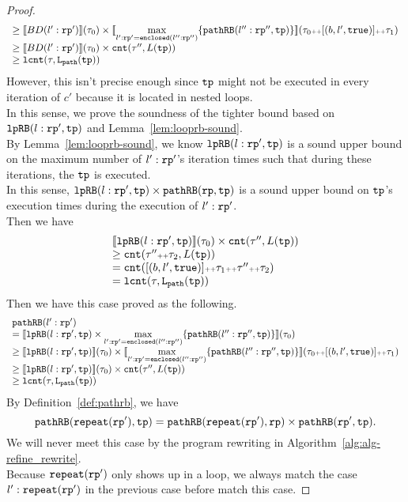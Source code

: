 \begin{proof}
\[\begin{array}{l}
  \geq \llbracket  BD(l':\mathtt{rp}') \rrbracket(\mathtt{\tau}_0) \times 
  \llbracket \max\limits_{l': \mathtt{rp}' = \mathtt{enclosed}(l'':\mathtt{rp}'')} \{\mathtt{pathRB}(l'':\mathtt{rp}'', \mathtt{tp})\} \rrbracket
  (\mathtt{\tau}_0 {\scriptscriptstyle ++} [(b, l', \mathtt{true})] {\scriptscriptstyle ++} \mathtt{\tau}_1)\\
  \geq \llbracket  BD(l':\mathtt{rp}') \rrbracket(\mathtt{\tau}_0) \times \mathtt{cnt}(\mathtt{\tau}'', L(\mathtt{tp})) \\
  \geq \mathtt{lcnt}(\mathtt{\tau}, \mathtt{L}_{\mathtt{path}}(\mathtt{tp}))
  \end{array}
\]
However, this isn't precise enough since $\mathtt{tp}$ might not be executed in every iteration of $c'$ because it is located in nested loops. 
\\
In this sense, we prove the soundness of the tighter bound based on $\mathtt{lpRB}(l:\mathtt{rp}', \mathtt{tp})$ and Lemma~\ref{lem:looprb-sound}.
\\
By Lemma~\ref{lem:looprb-sound}, we know $\mathtt{lpRB}(l:\mathtt{rp}', \mathtt{tp})$ is a sound upper bound on the maximum number of $l': \mathtt{rp}'$'s iteration times such that during these iterations, the $\mathtt{tp}$ is executed.
\\
In this sense, $\mathtt{lpRB}(l:\mathtt{rp}', \mathtt{tp}) \times \mathtt{pathRB}(\mathtt{rp}, \mathtt{tp})$ is a sound upper bound on $\mathtt{tp}$'s execution times during the execution of $l': \mathtt{rp}'$.
\\
Then we have
\[
  \begin{array}{l}
  \llbracket  \mathtt{lpRB}(l:\mathtt{rp}', \mathtt{tp}) \rrbracket(\mathtt{\tau}_0) \times \mathtt{cnt}(\mathtt{\tau}'', L(\mathtt{tp})) \\
  \geq \mathtt{cnt}(\mathtt{\tau}'' {\scriptscriptstyle ++} \mathtt{\tau}_2, L(\mathtt{tp}))\\
  = \mathtt{cnt}([(b, l', \mathtt{true})] {\scriptscriptstyle ++} \mathtt{\tau}_1 {\scriptscriptstyle ++} \mathtt{\tau}'' {\scriptscriptstyle ++} \mathtt{\tau}_2)\\
  = \mathtt{lcnt}(\mathtt{\tau}, \mathtt{L}_{\mathtt{path}}(\mathtt{tp}))
  \end{array}
\]
Then we have this case proved as the following.
\[
  \begin{array}{l}
  \mathtt{pathRB}(l':\mathtt{rp}') \\
  = \llbracket  \mathtt{lpRB}(l:\mathtt{rp}', \mathtt{tp}) \times \max\limits_{l': \mathtt{rp}' = \mathtt{enclosed}(l'':\mathtt{rp}'')} \{\mathtt{pathRB}(l'':\mathtt{rp}'', \mathtt{tp})\} \rrbracket(\mathtt{\tau}_0) \\
  \geq \llbracket  \mathtt{lpRB}(l:\mathtt{rp}', \mathtt{tp})  \rrbracket(\mathtt{\tau}_0) \times
  \llbracket \max\limits_{l': \mathtt{rp}' = \mathtt{enclosed}(l'':\mathtt{rp}'')} \{\mathtt{pathRB}(l'':\mathtt{rp}'', \mathtt{tp})\} \rrbracket 
  (\mathtt{\tau}_0 {\scriptscriptstyle ++} [(b, l', \mathtt{true})] {\scriptscriptstyle ++} \mathtt{\tau}_1) \\
  \geq \llbracket  \mathtt{lpRB}(l:\mathtt{rp}', \mathtt{tp}) \rrbracket(\mathtt{\tau}_0) \times \mathtt{cnt}(\mathtt{\tau}'', L(\mathtt{tp})) \\
  \geq \mathtt{lcnt}(\mathtt{\tau}, \mathtt{L}_{\mathtt{path}}(\mathtt{tp}))
  \end{array}
\]
%
By Definition~\ref{def:pathrb}, we have
\[
  \mathtt{pathRB}(\mathtt{repeat}(\mathtt{rp}'), \mathtt{tp}) = \mathtt{pathRB}(\mathtt{repeat}(\mathtt{rp}'), \mathtt{rp}) \times \mathtt{pathRB}(\mathtt{rp}', \mathtt{tp}).
\]
We will never meet this case by the program rewriting in Algorithm~\ref{alg:alg-refine_rewrite}.
\\
Because $\mathtt{repeat}(\mathtt{rp}')$ only shows up in a loop, we always match the case $l' : \mathtt{repeat}(\mathtt{rp}')$ in the previous case before match this case.
%
\end{proof}



